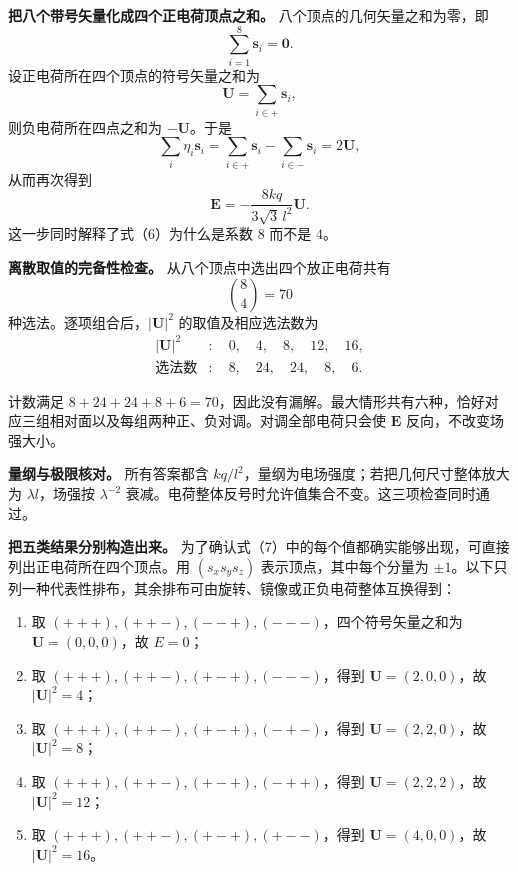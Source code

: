 \documentclass[12pt,a4paper,UTF8]{ctexart}
\newcommand{\tightlist}{\setlength{\itemsep}{0pt}\setlength{\parskip}{0pt}}
\begin{document}
\textbf{把八个带号矢量化成四个正电荷顶点之和。}
八个顶点的几何矢量之和为零，即 \[
\sum_{i=1}^{8}\boldsymbol s_i=\boldsymbol0.
\] 设正电荷所在四个顶点的符号矢量之和为 \[
\boldsymbol U=\sum_{i\in +}\boldsymbol s_i,
\] 则负电荷所在四点之和为 \(-\boldsymbol U\)。于是 \[
\sum_i\eta_i\boldsymbol s_i
=\sum_{i\in+}\boldsymbol s_i-
\sum_{i\in-}\boldsymbol s_i
=2\boldsymbol U,
\] 从而再次得到 \[
\boldsymbol E=-\frac{8kq}{3\sqrt3\,l^2}\boldsymbol U.
\] 这一步同时解释了式（6）为什么是系数 \(8\) 而不是 \(4\)。

\textbf{离散取值的完备性检查。} 从八个顶点中选出四个放正电荷共有 \[
\binom84=70
\] 种选法。逐项组合后，\(|\boldsymbol U|^2\) 的取值及相应选法数为 \[
\begin{aligned}
|\boldsymbol U|^2&:\quad 0,\quad4,\quad8,\quad12,\quad16,\\
\text{选法数}&:\quad 8,\quad24,\quad24,\quad8,\quad6.
\end{aligned}
\]

计数满足
\(8+24+24+8+6=70\)，因此没有漏解。最大情形共有六种，恰好对应三组相对面以及每组两种正、负对调。对调全部电荷只会使
\(\boldsymbol E\) 反向，不改变场强大小。

\textbf{量纲与极限核对。} 所有答案都含
\(kq/l^2\)，量纲为电场强度；若把几何尺寸整体放大为 \(\lambda l\)，场强按
\(\lambda^{-2}\)
衰减。电荷整体反号时允许值集合不变。这三项检查同时通过。

\textbf{把五类结果分别构造出来。}
为了确认式（7）中的每个值都确实能够出现，可直接列出正电荷所在四个顶点。用
\((s_xs_ys_z)\) 表示顶点，其中每个分量为
\(\pm1\)。以下只列一种代表性排布，其余排布可由旋转、镜像或正负电荷整体互换得到：

\begin{enumerate}
\def\labelenumi{\arabic{enumi}.}
\tightlist
\item
  取 \((+++),(++-),(--+),(---)\)，四个符号矢量之和为
  \(\boldsymbol U=(0,0,0)\)，故 \(E=0\)；
\item
  取 \((+++),(++-),(+-+),(---)\)，得到 \(\boldsymbol U=(2,0,0)\)，故
  \(|\boldsymbol U|^2=4\)；
\item
  取 \((+++),(++-),(+-+),(-+-)\)，得到 \(\boldsymbol U=(2,2,0)\)，故
  \(|\boldsymbol U|^2=8\)；
\item
  取 \((+++),(++-),(+-+),(-++)\)，得到 \(\boldsymbol U=(2,2,2)\)，故
  \(|\boldsymbol U|^2=12\)；
\item
  取 \((+++),(++-),(+-+),(+--)\)，得到 \(\boldsymbol U=(4,0,0)\)，故
  \(|\boldsymbol U|^2=16\)。
\end{enumerate}
\end{document}
